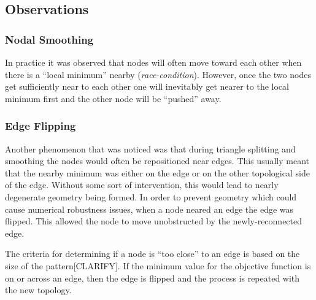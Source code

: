 \subsection{Observations}
\subsubsection{Nodal Smoothing}
In practice it was observed that nodes will often move toward each other
when there is a ``local minimum'' nearby ({\it race-condition}).
However, once the two nodes get sufficiently near to each other one will
inevitably get nearer to the local minimum first and the other node will
be ``pushed'' away.

\subsubsection{Edge Flipping}
Another phenomenon that was noticed was that during triangle splitting
and smoothing the nodes would often be repositioned near edges. This
usually meant that the nearby minimum was either on the edge or on the
other topological side of the edge. Without some sort of intervention,
this would lead to nearly degenerate geometry being formed. In order to
prevent geometry which could cause numerical robustness issues, when a
node neared an edge the edge was flipped. This allowed the node to move
unobstructed by the newly-reconnected edge.

The criteria for determining if a node is ``too close'' to an edge is
based on the size of the pattern[CLARIFY]. If the minimum value for the
objective function is on or across an edge, then the edge is flipped and
the process is repeated with the new topology.
